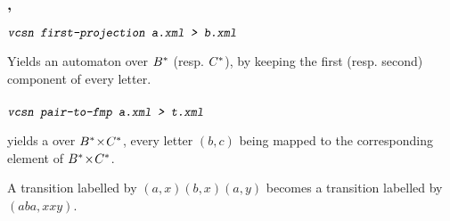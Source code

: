\subsubsection{, }
\begin{SwClCmd}
\begin{shell}
$ \textsl{\texttt{vcsn first-projection a.xml > b.xml}}
$
\end{shell}%
\end{SwClCmd}%
\begin{SwClTxt}
    Yields an automaton over ${{B}^{*}}$ (resp. ${{C}^{*}}$), by keeping the first 
    (resp. second) component of every letter.
\end{SwClTxt}%

% 
% 


\subsubsection{}

\begin{SwClCmd}
\begin{shell}
$ \textsl{\texttt{vcsn pair-to-fmp a.xml > t.xml}}
$
\end{shell}%
\end{SwClCmd}%
\begin{SwClTxt}
    yields a \fmpt over ${{B}^{*}}\! \times \!{{C}^{*}}$, every letter $(b,c)$ being mapped to the 
    corresponding element of ${{B}^{*}}\! \times \!{{C}^{*}}$.
\end{SwClTxt}%

\Spec 
A transition 
labelled by $(a,x)(b,x)(a,y)$ becomes a transition labelled by 
$(aba,xxy)$.


% 
% 
% 
% 
% 
% 
\endinput
